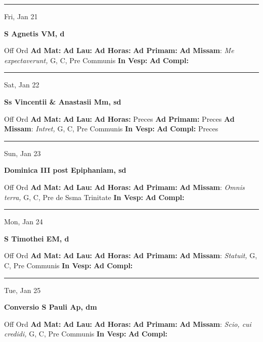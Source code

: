 \documentclass[letterpaper, 10pt]{article}
\begin{document}
\hrule
\begin{center}
Fri, Jan 21
\end{center}\textbf{ \large S Agnetis VM, \textnormal{\normalsize d}}
\begin{justify}
Off Ord
\textbf{Ad Mat: }
\textbf{Ad Lau: }
\textbf{Ad Horas: }
\textbf{Ad Primam: }
\textbf{Ad Missam}: \textit{Me expectaverunt,} G, C, Pre Communis
\textbf{In Vesp: }
\textbf{Ad Compl: }\end{justify}



\hrule
\begin{center}
Sat, Jan 22
\end{center}\textbf{ \large Ss Vincentii \& Anastasii Mm, \textnormal{\normalsize sd}}
\begin{justify}
Off Ord
\textbf{Ad Mat: }
\textbf{Ad Lau: }
\textbf{Ad Horas: }Preces
\textbf{Ad Primam: }Preces
\textbf{Ad Missam}: \textit{Intret,} G, C, Pre Communis
\textbf{In Vesp: }
\textbf{Ad Compl: }Preces\end{justify}



\hrule
\begin{center}
Sun, Jan 23
\end{center}\textbf{ \large Dominica III post Epiphaniam, \textnormal{\normalsize sd}}
\begin{justify}
Off Ord
\textbf{Ad Mat: }
\textbf{Ad Lau: }
\textbf{Ad Horas: }
\textbf{Ad Primam: }
\textbf{Ad Missam}: \textit{Omnis terra,} G, C, Pre de Ssma Trinitate
\textbf{In Vesp: }
\textbf{Ad Compl: }\end{justify}



\hrule
\begin{center}
Mon, Jan 24
\end{center}\textbf{ \large S Timothei EM, \textnormal{\normalsize d}}
\begin{justify}
Off Ord
\textbf{Ad Mat: }
\textbf{Ad Lau: }
\textbf{Ad Horas: }
\textbf{Ad Primam: }
\textbf{Ad Missam}: \textit{Statuit,} G, C, Pre Communis
\textbf{In Vesp: }
\textbf{Ad Compl: }\end{justify}



\hrule
\begin{center}
Tue, Jan 25
\end{center}\textbf{ \large Conversio S Pauli Ap, \textnormal{\normalsize dm}}
\begin{justify}
Off Ord
\textbf{Ad Mat: }
\textbf{Ad Lau: }
\textbf{Ad Horas: }
\textbf{Ad Primam: }
\textbf{Ad Missam}: \textit{Scio, cui credidi,} G, C, Pre Communis
\textbf{In Vesp: }
\textbf{Ad Compl: }\end{justify}
\end{document}
